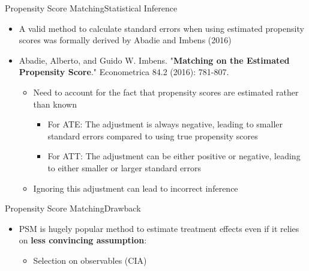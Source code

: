 \documentclass[hyperref={pdfpagelabels=false}]{beamer}
\begin{document}
\begin{frame}{Propensity Score Matching}{Statistical Inference}
	\begin{itemize}
		
		\item A valid method to calculate standard errors when using estimated propensity scores was formally derived by Abadie and Imbens (2016)
		\vspace{0.2cm}
		\item Abadie, Alberto, and Guido W. Imbens. "\textbf{Matching on the Estimated Propensity Score}." Econometrica 84.2 (2016): 781-807.
		\vspace{0.2cm}
		\begin{itemize}		
			
			\item Need to account for the fact that propensity scores are estimated rather than known
			\vspace{0.2cm}
					\begin{itemize}		
			\item For ATE: The adjustment is always negative, leading to smaller standard errors compared to using true propensity scores
			\vspace{0.2cm}
			\item For ATT: The adjustment can be either positive or negative, leading to either smaller or larger standard errors				
			\vspace{0.2cm}
					\end{itemize}		
			\item Ignoring this adjustment can lead to incorrect inference
		\end{itemize}		
	\end{itemize}
\end{frame}




\begin{frame}{Propensity Score Matching}{Drawback}
	\begin{itemize}
		\item  PSM is hugely popular method to estimate treatment effects even if it relies on \textbf{less convincing assumption}: 
		\vspace{0.2cm}
		\begin{itemize}
			\item Selection on observables (CIA) 	
		\end{itemize}
		
		
	\end{itemize}	
\end{frame}
\end{document}
